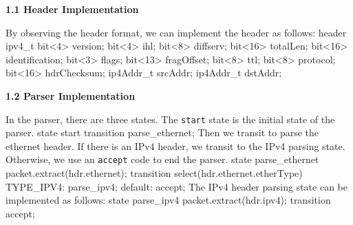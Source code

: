\documentclass{article}%
\newenvironment{code}%
   {\snugshade\verbatim}%
   {\endverbatim\endsnugshade}
\begin{document}
\begin{Large}
\begin{flushleft}
\begin{LARGE}
\textbf{1.1 Header Implementation}
\end{LARGE}
\end{flushleft}

By observing the header format, we can implement the header as follows:
\begin{code}
    header ipv4_t {
        bit<4>    version;
        bit<4>    ihl;
        bit<8>    diffserv;
        bit<16>   totalLen;
        bit<16>   identification;
        bit<3>    flags;
        bit<13>   fragOffset;
        bit<8>    ttl;
        bit<8>    protocol;
        bit<16>   hdrChecksum;
        ip4Addr_t srcAddr;
        ip4Addr_t dstAddr;
    }
\end{code}



\begin{flushleft}
\begin{LARGE}
\textbf{1.2 Parser Implementation}
\end{LARGE}
\end{flushleft}

In the parser, there are three states. The \texttt{start} state is the initial state of the parser.
\begin{code}
    state start {
        transition parse_ethernet;
    }
\end{code}
Then we transit to parse the ethernet header. If there is an IPv4 header, we transit to the IPv4 parsing state. Otherwise, we use an \texttt{accept} code to end the parser.
\newpage
\begin{code}
    state parse_ethernet {
        packet.extract(hdr.ethernet);
        transition select(hdr.ethernet.etherType) {
            TYPE_IPV4: parse_ipv4;
            default: accept;
        }
    }
\end{code}
The IPv4 header parsing state can be implemented as follows:
\begin{code}
    state parse_ipv4 {
        packet.extract(hdr.ipv4);
        transition accept;
    }
\end{code}


\end{Large}
\end{document}
